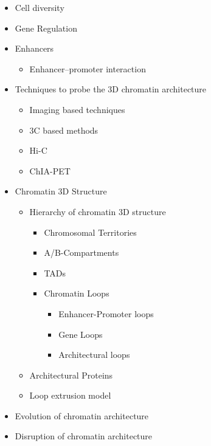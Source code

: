 \documentclass[a4paper,twoside=true,openright,parskip=full,chapterprefix=true,11pt,headings=normal,bibliography=totoc,listof=totoc,titlepage=on,captions=tableabove,draft=false]{scrreprt}
\providecommand{\tightlist}{%
  \setlength{\itemsep}{0pt}\setlength{\parskip}{0pt}}
\theoremstyle{definition}
\theoremstyle{definition}
\theoremstyle{definition}
\theoremstyle{remark}
\begin{document}
\begin{itemize}
\tightlist
\item
  Cell diversity
\item
  Gene Regulation
\item
  Enhancers

  \begin{itemize}
  \tightlist
  \item
    Enhancer--promoter interaction
  \end{itemize}
\item
  Techniques to probe the 3D chromatin architecture

  \begin{itemize}
  \tightlist
  \item
    Imaging based techniques
  \item
    3C based methods
  \item
    Hi-C
  \item
    ChIA-PET
  \end{itemize}
\item
  Chromatin 3D Structure

  \begin{itemize}
  \tightlist
  \item
    Hierarchy of chromatin 3D structure

    \begin{itemize}
    \tightlist
    \item
      Chromosomal Territories
    \item
      A/B-Compartments
    \item
      TADs
    \item
      Chromatin Loops

      \begin{itemize}
      \tightlist
      \item
        Enhancer-Promoter loops
      \item
        Gene Loops
      \item
        Architectural loops
      \end{itemize}
    \end{itemize}
  \item
    Architectural Proteins
  \item
    Loop extrusion model
  \end{itemize}
\item
  Evolution of chromatin architecture
\item
  Disruption of chromatin architecture
\end{itemize}
\end{document}
